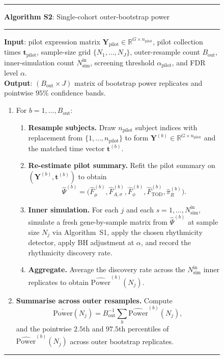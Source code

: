 \documentclass{article}
\begin{document}
\begin{figure}[!htbp]
\small
\hrule\vspace{4pt}
\textbf{Algorithm S2}: Single-cohort outer-bootstrap power \vspace{2pt}
\hrule\vspace{4pt}
\textbf{Input}: pilot expression matrix
$\mathbf{Y}_{\mathrm{pilot}} \in \mathbb{R}^{G \times n_{\mathrm{pilot}}}$,
pilot collection times $\mathbf{t}_{\mathrm{pilot}}$, sample-size grid
$\{N_1,\ldots,N_J\}$, outer-resample count $B_{\mathrm{out}}$,
inner-simulation count $N_{\mathrm{sim}}^{\mathrm{in}}$, screening
threshold $\alpha_{\mathrm{pilot}}$, and FDR level $\alpha$.\\
\textbf{Output}: $(B_{\mathrm{out}} \times J)$ matrix of bootstrap
power replicates and pointwise $95\%$ confidence bands.
\vspace{4pt}

\begin{enumerate}
\setlength{\itemsep}{2pt}

\item For $b=1,\ldots,B_{\mathrm{out}}$:
\begin{enumerate}
\setlength{\itemsep}{1pt}

\item \textbf{Resample subjects.} Draw $n_{\mathrm{pilot}}$ subject
indices with replacement from $\{1,\ldots,n_{\mathrm{pilot}}\}$ to form
$\mathbf{Y}^{(b)} \in \mathbb{R}^{G \times n_{\mathrm{pilot}}}$ and the
matched time vector $\mathbf{t}^{(b)}$.

\item \textbf{Re-estimate pilot summary.} Refit the pilot summary on
$(\mathbf{Y}^{(b)},\mathbf{t}^{(b)})$ to obtain
\[
\hat{\Psi}^{(b)}
=
\big(
\hat{F}_\mu^{(b)},
\hat{F}_{A,\sigma}^{(b)},
\hat{F}_\phi^{(b)},
\hat{F}_{\mathrm{TOD}}^{(b)},
\hat{\pi}_R^{(b)}
\big).
\]

\item \textbf{Inner simulation.} For each $j$ and each
$s=1,\ldots,N_{\mathrm{sim}}^{\mathrm{in}}$, simulate a fresh
gene-by-sample matrix from $\hat{\Psi}^{(b)}$ at sample size $N_j$ via
Algorithm~S1, apply the chosen rhythmicity detector, apply BH adjustment
at $\alpha$, and record the rhythmicity discovery rate.

\item \textbf{Aggregate.} Average the discovery rate across the
$N_{\mathrm{sim}}^{\mathrm{in}}$ inner replicates to obtain
$\widehat{\mathrm{Power}}^{(b)}(N_j)$.

\end{enumerate}

\item \textbf{Summarise across outer resamples.} Compute
\[
\bar{\mathrm{Power}}(N_j)
=
B_{\mathrm{out}}^{-1}
\sum_b
\widehat{\mathrm{Power}}^{(b)}(N_j),
\]
and the pointwise $2.5$th and $97.5$th percentiles of
$\widehat{\mathrm{Power}}^{(b)}(N_j)$ across outer bootstrap replicates.

\end{enumerate}
\vspace{2pt}\hrule
\end{figure}
\end{document}
